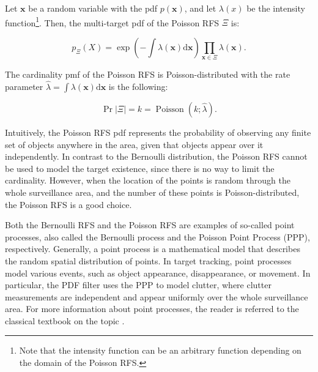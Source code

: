 \begin{definition}
    Let $\mathbf{x}$ be a random variable with the pdf $p(\mathbf{x})$, and let $\lambda(x)$ be the intensity function\footnote{Note that the intensity function can be an arbitrary function depending on the domain of the Poisson RFS.}. Then, the multi-target pdf of the Poisson RFS $\Xi$ is:

    \begin{equation}\label{eq:poisson-rfs-pdf}
        p_\Xi(X) = \exp\left(-\int \lambda(\mathbf{x}) \mathrm{d}\mathbf{x}\right)
        \prod_{\mathbf{x} \in \Xi} \lambda(\mathbf{x}).
    \end{equation}

    \noindent The cardinality pmf of the Poisson RFS is Poisson-distributed with the rate parameter $\hat{\lambda} = \int \lambda(\mathbf{x}) \mathrm{d}\mathbf{x}$ is the following:

    \begin{equation}
        \Pr{|\Xi| = k} = \operatorname{Poisson}(k; \hat{\lambda}).
    \end{equation}
\end{definition}

Intuitively, the Poisson RFS pdf represents the probability of observing any finite set of objects anywhere in the area, given that objects appear over it independently. In contrast to the Bernoulli distribution, the Poisson RFS cannot be used to model the target existence, since there is no way to limit the cardinality. However, when the location of the points is random through the whole surveillance area, and the number of these points is Poisson-distributed, the Poisson RFS is a good choice.

Both the Bernoulli RFS and the Poisson RFS are examples of so-called point processes, also called the Bernoulli process and the Poisson Point Process (PPP), respectively. Generally, a point process is a mathematical model that describes the random spatial distribution of points. In target tracking, point processes model various events, such as object appearance, disappearance, or movement. In particular, the PDF filter uses the PPP to model clutter, where clutter measurements are independent and appear uniformly over the whole surveillance area. For more information about point processes, the reader is referred to the classical textbook on the topic \cite{streitPoissonPointProcesses2010}.
